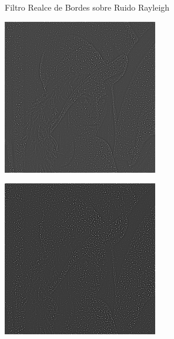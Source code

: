 \documentclass{beamer}
\begin{document}
\begin{frame}[fragile]{Filtro Realce de Bordes sobre Ruido Rayleigh}
	\begin{minipage}{0.25\linewidth}
		\centering
		\includegraphics[width=\linewidth]{../results/lena_rayleigh_xi1_bordes}
	\end{minipage}\hfill
	\begin{minipage}{0.25\linewidth}
		\centering
		\includegraphics[width=\linewidth]{../results/lena_rayleigh_xi2_bordes}

\end{minipage}
\end{frame}
\end{document}
